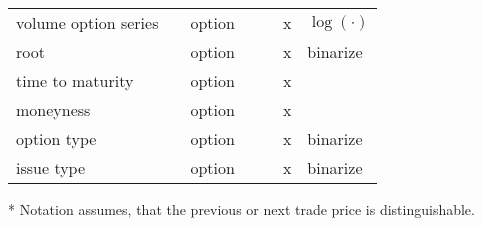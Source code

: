 \begin{threeparttable}
\begin{tabular}{@{}lllllll@{}}
        volume option series    &                                                                                                  & option               &      &      & x    & $\log(\cdot)$ \\
        root                    &                                                                                                  & option               &      &      & x    & binarize      \\
        time to maturity        &                                                                                                  & option               &      &      & x    &               \\
        moneyness               &                                                                                                  & option               &      &      & x    &               \\
        option type             &                                                                                                  & option               &      &      & x    & binarize      \\
        issue type              &                                                                                                  & option               &      &      & x    & binarize      \\ \bottomrule
    \end{tabular}
    \begin{tablenotes}\footnotesize
        \item[*] Notation assumes, that the previous or next trade price is distinguishable.
    \end{tablenotes}
\end{threeparttable}
